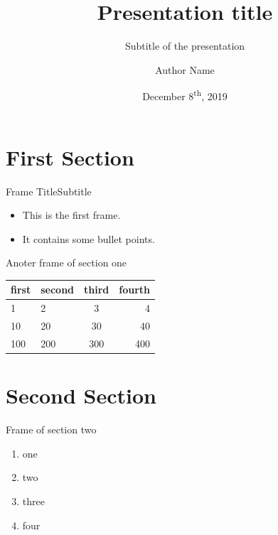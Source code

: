 \documentclass[
  english,            %
  aspectratio=169,    %
]{tumbeamer}
\title{Presentation title}
\subtitle{Subtitle of the presentation}
\author{Author Name}
\institute{\theGroupName\\\theSchoolName\\\theUniversityName}
\date[12/08/2019]{December 8\textsuperscript{th}, 2019}
\begin{document}
\maketitle

\section{First Section}
\begin{frame}{Frame Title}{Subtitle}
  \begin{itemize}
    \item This is the first frame.
    \item It contains some bullet points.
  \end{itemize}
\end{frame}

\begin{frame}{Anoter frame of section one}
  \centering
  \vfill
  \begin{tabular}{llcr}
    \toprule
    first & second & third & fourth \\
    \midrule
    1     & 2      & 3     & 4      \\
    10    & 20     & 30    & 40     \\
    100   & 200    & 300   & 400    \\
    \bottomrule
  \end{tabular}
  \vfill
\end{frame}

\section{Second Section}
\begin{frame}{Frame of section two}
  \begin{enumerate}
    \item one
    \item two
    \item three
    \item four
  \end{enumerate}
\end{frame}
\end{document}
